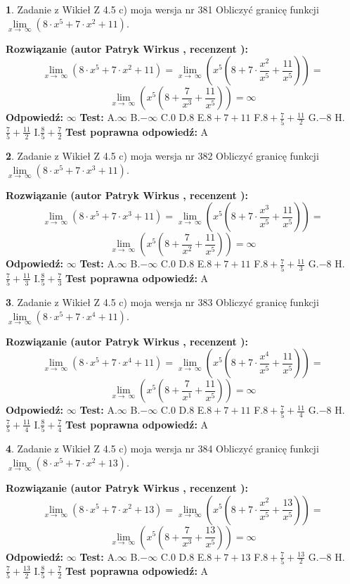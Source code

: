 \documentclass[12pt, a4paper]{article}
\theoremstyle{definition} %
\newtheorem{zad}{}
\newcommand{\zadStart}[1]{\begin{zad}#1\newline}
\newcommand{\zadStop}{\end{zad}}
\newcommand{\rozwStart}[2]{\noindent \textbf{Rozwiązanie (autor #1 , recenzent #2): }\newline}
\newcommand{\rozwStop}{\newline}
\newcommand{\odpStart}{\noindent \textbf{Odpowiedź:}\newline}
\newcommand{\odpStop}{\newline}
\newcommand{\testStart}{\noindent \textbf{Test:}\newline}
\newcommand{\testStop}{\newline}
\newcommand{\kluczStart}{\noindent \textbf{Test poprawna odpowiedź:}\newline}
\newcommand{\kluczStop}{\newline}
\begin{document}
\zadStart{Zadanie z Wikieł Z 4.5 c) moja wersja nr 381}
Obliczyć granicę funkcji  $\lim\limits_{x\to\ \infty}(8 \cdot x^{5}+7 \cdot x^{2}+11)$.
\zadStop
\rozwStart{Patryk Wirkus}{}
$$\lim\limits_{x\to\ \infty}(8 \cdot x^{5}+7 \cdot x^{2}+11) = \lim\limits_{x\to\ \infty}(x^{5}(8 +7 \cdot \frac{x^{2}}{x^{5}}+\frac{11}{x^{5}})) =$$ $$\lim\limits_{x\to\ \infty}(x^{5}(8 +\frac{7}{x^{3}}+\frac{11}{x^{5}})) =\infty$$
\rozwStop
\odpStart
$\infty$
\odpStop
\testStart
A.$\infty$ B.$-\infty$ C.$0$ D.$8$ E.$8 + 7 + 11$
F.$8+\frac{7}{5}+\frac{11}{2}$ G.$-8$
H.$\frac{7}{5}+\frac{11}{2}$
I.$\frac{8}{5}+\frac{7}{2}$
\testStop
\kluczStart
A
\kluczStop



\zadStart{Zadanie z Wikieł Z 4.5 c) moja wersja nr 382}
Obliczyć granicę funkcji  $\lim\limits_{x\to\ \infty}(8 \cdot x^{5}+7 \cdot x^{3}+11)$.
\zadStop
\rozwStart{Patryk Wirkus}{}
$$\lim\limits_{x\to\ \infty}(8 \cdot x^{5}+7 \cdot x^{3}+11) = \lim\limits_{x\to\ \infty}(x^{5}(8 +7 \cdot \frac{x^{3}}{x^{5}}+\frac{11}{x^{5}})) =$$ $$\lim\limits_{x\to\ \infty}(x^{5}(8 +\frac{7}{x^{2}}+\frac{11}{x^{5}})) =\infty$$
\rozwStop
\odpStart
$\infty$
\odpStop
\testStart
A.$\infty$ B.$-\infty$ C.$0$ D.$8$ E.$8 + 7 + 11$
F.$8+\frac{7}{5}+\frac{11}{3}$ G.$-8$
H.$\frac{7}{5}+\frac{11}{3}$
I.$\frac{8}{5}+\frac{7}{3}$
\testStop
\kluczStart
A
\kluczStop



\zadStart{Zadanie z Wikieł Z 4.5 c) moja wersja nr 383}
Obliczyć granicę funkcji  $\lim\limits_{x\to\ \infty}(8 \cdot x^{5}+7 \cdot x^{4}+11)$.
\zadStop
\rozwStart{Patryk Wirkus}{}
$$\lim\limits_{x\to\ \infty}(8 \cdot x^{5}+7 \cdot x^{4}+11) = \lim\limits_{x\to\ \infty}(x^{5}(8 +7 \cdot \frac{x^{4}}{x^{5}}+\frac{11}{x^{5}})) =$$ $$\lim\limits_{x\to\ \infty}(x^{5}(8 +\frac{7}{x^{1}}+\frac{11}{x^{5}})) =\infty$$
\rozwStop
\odpStart
$\infty$
\odpStop
\testStart
A.$\infty$ B.$-\infty$ C.$0$ D.$8$ E.$8 + 7 + 11$
F.$8+\frac{7}{5}+\frac{11}{4}$ G.$-8$
H.$\frac{7}{5}+\frac{11}{4}$
I.$\frac{8}{5}+\frac{7}{4}$
\testStop
\kluczStart
A
\kluczStop



\zadStart{Zadanie z Wikieł Z 4.5 c) moja wersja nr 384}
Obliczyć granicę funkcji  $\lim\limits_{x\to\ \infty}(8 \cdot x^{5}+7 \cdot x^{2}+13)$.
\zadStop
\rozwStart{Patryk Wirkus}{}
$$\lim\limits_{x\to\ \infty}(8 \cdot x^{5}+7 \cdot x^{2}+13) = \lim\limits_{x\to\ \infty}(x^{5}(8 +7 \cdot \frac{x^{2}}{x^{5}}+\frac{13}{x^{5}})) =$$ $$\lim\limits_{x\to\ \infty}(x^{5}(8 +\frac{7}{x^{3}}+\frac{13}{x^{5}})) =\infty$$
\rozwStop
\odpStart
$\infty$
\odpStop
\testStart
A.$\infty$ B.$-\infty$ C.$0$ D.$8$ E.$8 + 7 + 13$
F.$8+\frac{7}{5}+\frac{13}{2}$ G.$-8$
H.$\frac{7}{5}+\frac{13}{2}$
I.$\frac{8}{5}+\frac{7}{2}$
\testStop
\kluczStart
A
\kluczStop
\end{document}
